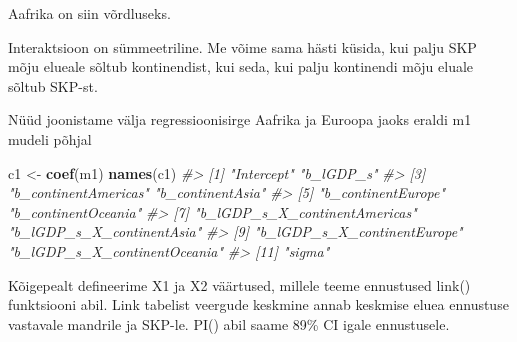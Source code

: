 \documentclass[]{book}
\newenvironment{Shaded}{\begin{snugshade}}{\end{snugshade}}
\newcommand{\CommentTok}[1]{\textcolor[rgb]{0.56,0.35,0.01}{\textit{#1}}}
\newcommand{\KeywordTok}[1]{\textcolor[rgb]{0.13,0.29,0.53}{\textbf{#1}}}
\newcommand{\NormalTok}[1]{#1}
\newcommand{\StringTok}[1]{\textcolor[rgb]{0.31,0.60,0.02}{#1}}
\begin{document}
Aafrika on siin võrdluseks.

Interaktsioon on sümmeetriline. Me võime sama hästi küsida, kui palju SKP mõju elueale sõltub kontinendist, kui seda, kui palju kontinendi mõju eluale sõltub SKP-st.

Nüüd joonistame välja regressioonisirge Aafrika ja Euroopa jaoks eraldi m1 mudeli põhjal

\begin{Shaded}
\begin{Highlighting}[]
\NormalTok{c1 <-}\StringTok{ }\KeywordTok{coef}\NormalTok{(m1)}
\KeywordTok{names}\NormalTok{(c1)}
\CommentTok{#>  [1] "Intercept"                    "b_lGDP_s"                    }
\CommentTok{#>  [3] "b_continentAmericas"          "b_continentAsia"             }
\CommentTok{#>  [5] "b_continentEurope"            "b_continentOceania"          }
\CommentTok{#>  [7] "b_lGDP_s_X_continentAmericas" "b_lGDP_s_X_continentAsia"    }
\CommentTok{#>  [9] "b_lGDP_s_X_continentEurope"   "b_lGDP_s_X_continentOceania" }
\CommentTok{#> [11] "sigma"}
\end{Highlighting}
\end{Shaded}

Kõigepealt defineerime X1 ja X2 väärtused, millele teeme ennustused link() funktsiooni abil. Link tabelist veergude keskmine annab keskmise eluea ennustuse vastavale mandrile ja SKP-le. PI() abil saame 89\% CI igale ennustusele.
\end{document}
